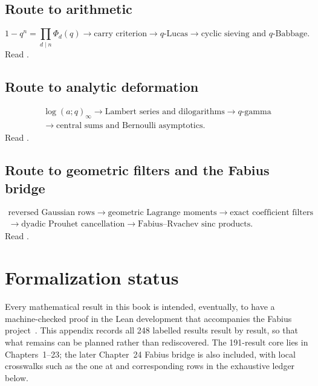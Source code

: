\documentclass[11pt,a4paper,oneside,openany]{book}
\theoremstyle{definition}
\theoremstyle{remark}
\begin{document}
\section*{Route to arithmetic}
\[
 1-q^n=\prod_{d\mid n}\Phi_d(q)
 \longrightarrow \text{carry criterion}
 \longrightarrow q\text{-Lucas}
 \longrightarrow \text{cyclic sieving and }q\text{-Babbage}.
\]
Read .

\section*{Route to analytic deformation}
\[
\begin{gathered}
 \log(a;q)_\infty
 \longrightarrow \text{Lambert series and dilogarithms}
 \longrightarrow q\text{-gamma}\\
 \longrightarrow \text{central sums and Bernoulli asymptotics}.
\end{gathered}
\]
Read .

\section*{Route to geometric filters and the Fabius bridge}
\[
\begin{gathered}
 \text{reversed Gaussian rows}
 \longrightarrow \text{geometric Lagrange moments}
 \longrightarrow \text{exact coefficient filters}\\
 \longrightarrow \text{dyadic Prouhet cancellation}
 \longrightarrow \text{Fabius--Rvachev sinc products}.
\end{gathered}
\]
Read .

\chapter{Formalization status}\label{app:lean-status}

Every mathematical result in this book is intended, eventually, to have a
machine-checked proof in the Lean development that accompanies the Fabius
project~\cite{ReshetnikovProveIt2026}.  This appendix records all 248 labelled
results result by result, so that what remains can be planned rather than
rediscovered.  The 191-result core lies in Chapters~1--23; the later
Chapter~24 Fabius bridge is also included, with local crosswalks such as the
one at  and corresponding rows in the exhaustive ledger
below.
\end{document}
